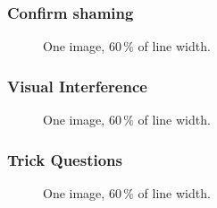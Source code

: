         \subsubsection*{Confirm shaming}
        \blind[1]
        \begin{figure}
            \centering
            \caption{One image, $60\,\%$ of line width.  
              }
            \label{fig:TODO}
        \end{figure}
        \subsubsection*{Visual Interference}
        \blind[1]
        \begin{figure}
            \centering
            \caption{One image, $60\,\%$ of line width.  
              }
            \label{fig:TODO}
        \end{figure}
        \subsubsection*{Trick Questions}
        \blind[1]
        \begin{figure}
            \centering
            \caption{One image, $60\,\%$ of line width.  
              }
            \label{fig:TODO}
        \end{figure}
